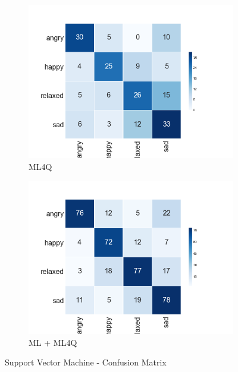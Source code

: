 \begin{figure}[H]
  \centering
  \begin{subfigure}[b]{0.49\linewidth}
    \includegraphics[width=\linewidth]{./chapters/chapter4/images/4Q/CM_SVM.png}
    \caption{ML4Q}
  \end{subfigure}
  \begin{subfigure}[b]{0.49\linewidth}
   \includegraphics[width=\linewidth]{./chapters/chapter4/images/join/CM_SVM.png}
    \caption{ML + ML4Q}
  \end{subfigure}
  \caption{Support Vector Machine - Confusion Matrix}
  \label{fig:svm}
\end{figure}

